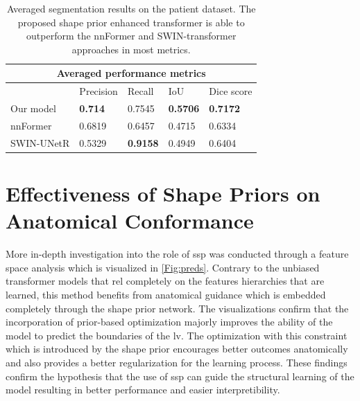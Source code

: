 \begin{table}[h!t]
\begin{tabular}{ |p{2.3cm}|p{2.3cm}|p{2.3cm}|p{2.3cm}|p{2.3cm}|}
\hline
\multicolumn{5}{|c|}{Averaged performance metrics} \\
\hline
& Precision & Recall & IoU & Dice score \\
\hline
Our model & \textbf{0.714} & 0.7545 & \textbf{0.5706} & \textbf{0.7172} \\
\hline
nnFormer & 0.6819 & 0.6457 & 0.4715 & 0.6334 \\
\hline
SWIN-UNetR & 0.5329 & \textbf{0.9158} & 0.4949 & 0.6404 \\
\hline
\end{tabular}
\caption{Averaged segmentation results on the patient dataset. The proposed shape prior enhanced transformer is able to outperform the nnFormer \cite{zhou2023nnformer} and SWIN-transformer \cite{10.1007/978-3-031-08999-2_22} approaches in most metrics.}
\label{tab:quantitative_comparison}
\end{table}

\section{Effectiveness of Shape Priors on Anatomical Conformance}
More in-depth investigation into the role of \gls{ssp} was conducted through a feature space analysis which is visualized in \cref{Fig:preds}. Contrary to the unbiased transformer models that rel completely on the features hierarchies that are learned, this method benefits from anatomical guidance which is embedded completely through the shape prior network. The visualizations confirm that the incorporation of prior-based optimization majorly improves the ability of the model to predict the boundaries of the \gls{lv}. The optimization with this constraint which is introduced by the shape prior encourages better outcomes anatomically and also provides a better regularization for the learning process. These findings confirm the hypothesis that the use of \gls{ssp} can guide the structural learning of the model resulting in better performance and easier interpretibility.

